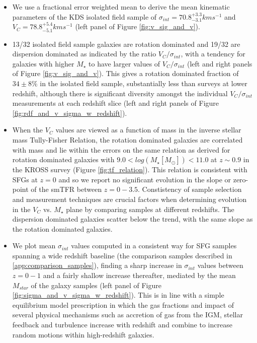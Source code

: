 \documentclass[fleqn,usenatbib]{mn2e}
\begin{document}
\begin{itemize}
    \item We use a fractional error weighted mean to derive the mean kinematic parameters of the KDS isolated field sample of $\sigma_{int} = 70.8^{+3.3}_{-3.1} kms^{-1}$ and $V_{C} = 78.8^{+5.4}_{-5.1}kms^{-1}$ (left panel of Figure \ref{fig:v_sig_and_v}). 
    \item 13/32 isolated field sample galaxies are rotation dominated and 19/32 are dispersion dominated as indicated by the ratio $V_{C}/\sigma_{int}$, with a tendency for galaxies with higher $M_{\star}$ to have larger values of $V_{C}/\sigma_{int}$ (left and right panels of Figure \ref{fig:v_sig_and_v}).
    This gives a rotation dominated fraction of $34 \pm 8 \%$ in the isolated field sample, substantially less than surveys at lower redshift, although there is significant diversity amongst the individual $V_{C}/\sigma_{int}$ measurements at each redshift slice (left and right panels of Figure \ref{fig:rdf_and_v_sigma_w_redshift}).
    \item When the $V_{C}$ values are viewed as a function of mass in the inverse stellar mass Tully-Fisher Relation, the rotation dominated galaxies are correlated with mass and lie within the errors on the same relation as derived for rotation dominated galaxies with $9.0 < log(M_{\star}[M_{\odot}]) < 11.0$ at $z\sim0.9$ in the KROSS survey (Figure \ref{fig:tf_relation}). %
    This relation is consistent with SFGs at $z=0$ and so we report no significant evolution in the slope or zero-point of the smTFR between $z=0-3.5$.
    Constistency of sample selection and measurement techniques are crucial factors when determining evolution in the $V_{C}$ vs. $M_{\star}$ plane by comparing samples at different redshifts.
    The dispersion dominated galaxies scatter below the trend, with the same slope as the rotation dominated galaxies.
    \item We plot mean $\sigma_{int}$ values computed in a consistent way for SFG samples spanning a wide redshift baseline (the comparison samples described in \cref{app:comparison_samples}), finding a sharp increase in $\sigma_{int}$ values between $z=0-1$ and a fairly shallow increase thereafter, mediated by the mean $M_{star}$ of the galaxy samples (left panel of Figure \ref{fig:sigma_and_v_sigma_w_redshift}).
    This is in line with a simple equilibrium model prescription in which the gas fractions and impact of several physical mechanisms such as accretion of gas from the IGM, stellar feedback and turbulence increase with redshift and combine to increase random motions within high-redshift galaxies.

\end{itemize}
\end{document}
